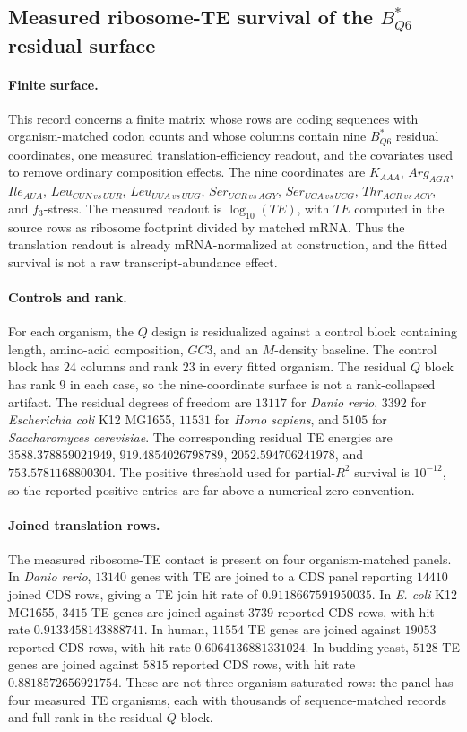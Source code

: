 \subsection{Measured ribosome-TE survival of the $B^{\ast}_{Q6}$ residual surface}\label{sec:bioreality-b-star-q6-measured-te-survival}

\paragraph{Finite surface.}
This record concerns a finite matrix whose rows are coding sequences with organism-matched codon counts and whose columns contain nine $B^{\ast}_{Q6}$ residual coordinates, one measured translation-efficiency readout, and the covariates used to remove ordinary composition effects.  The nine coordinates are $K_{AAA}$, $Arg_{AGR}$, $Ile_{AUA}$, $Leu_{CUN\,vs\,UUR}$, $Leu_{UUA\,vs\,UUG}$, $Ser_{UCR\,vs\,AGY}$, $Ser_{UCA\,vs\,UCG}$, $Thr_{ACR\,vs\,ACY}$, and $f_3$-stress.  The measured readout is $\log_{10}(TE)$, with $TE$ computed in the source rows as ribosome footprint divided by matched mRNA.  Thus the translation readout is already mRNA-normalized at construction, and the fitted survival is not a raw transcript-abundance effect.

\paragraph{Controls and rank.}
For each organism, the $Q$ design is residualized against a control block containing length, amino-acid composition, $GC3$, and an $M$-density baseline.  The control block has $24$ columns and rank $23$ in every fitted organism.  The residual $Q$ block has rank $9$ in each case, so the nine-coordinate surface is not a rank-collapsed artifact.  The residual degrees of freedom are $13117$ for \emph{Danio rerio}, $3392$ for \emph{Escherichia coli} K12 MG1655, $11531$ for \emph{Homo sapiens}, and $5105$ for \emph{Saccharomyces cerevisiae}.  The corresponding residual TE energies are $3588.378859021949$, $919.4854026798789$, $2052.594706241978$, and $753.5781168800304$.  The positive threshold used for partial-$R^2$ survival is $10^{-12}$, so the reported positive entries are far above a numerical-zero convention.

\paragraph{Joined translation rows.}
The measured ribosome-TE contact is present on four organism-matched panels.  In \emph{Danio rerio}, $13140$ genes with TE are joined to a CDS panel reporting $14410$ joined CDS rows, giving a TE join hit rate of $0.9118667591950035$.  In \emph{E. coli} K12 MG1655, $3415$ TE genes are joined against $3739$ reported CDS rows, with hit rate $0.9133458143888741$.  In human, $11554$ TE genes are joined against $19053$ reported CDS rows, with hit rate $0.6064136881331024$.  In budding yeast, $5128$ TE genes are joined against $5815$ reported CDS rows, with hit rate $0.8818572656921754$.  These are not three-organism saturated rows: the panel has four measured TE organisms, each with thousands of sequence-matched records and full rank in the residual $Q$ block.

